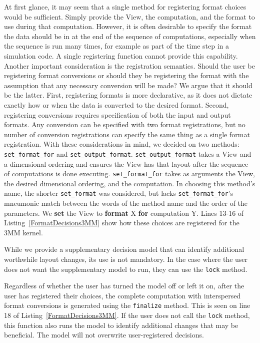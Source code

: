 \documentclass[sigconf,review=true]{acmart}
\begin{document}
At first glance, it may seem that a single method for registering format choices would be sufficient. 
Simply provide the View, the computation, and the format to use during that computation.
However, it is often desirable to specify the format the data should be in at the end of the sequence of computations, especially when the sequence is run many times, for example as part of the time step in a simulation code.
A single registering function cannot provide this capability. 
Another important consideration is the registration semantics. 
Should the user be registering format conversions or should they be registering the format with the assumption that any necessary conversion will be made?
We argue that it should be the latter.
First, registering formats is more declarative, as it does not dictate exactly how or when the data is converted to the desired format.
Second, registering conversions requires specification of both the input and output formats. 
Any conversion can be specified with two format registrations, but no number of conversion registrations can specify the same thing as a single format registration.
With these considerations in mind, we decided on two methods: \verb.set_format_for. and \verb.set_output_format..
\verb.set_output_format. takes a View and a dimensional ordering and ensures the View has that layout after the sequence of computations is done executing.
\verb.set_format_for. takes as arguments the View, the desired dimensional ordering, and the computation. In choosing this method's name, the shorter \verb.set_format. was considered, but lacks \verb.set_format_for.'s mneumonic match between the words of the method name and the order of the parameters. We \textbf{set} the View to \textbf{format} X \textbf{for} computation Y. 
Lines 13-16 of Listing~\ref{FormatDecisions3MM} show how these choices are registered for the 3MM kernel. 

While we provide a supplementary decision model that can identify additional worthwhile layout changes, its use is not mandatory.
In the case where the user does not want the supplementary model to run, they can use the \verb.lock. method. 

Regardless of whether the user has turned the model off or left it on, 
after the user has registered their choices, the complete computation with interspersed format conversions is generated using the \verb.finalize. method.
This is seen on line 18 of Listing~\ref{FormatDecisions3MM}.
If the user does not call the \verb.lock. method, this function also runs the model to identify additional changes that may be beneficial. The model will not overwrite user-registered decisions.
\end{document}
